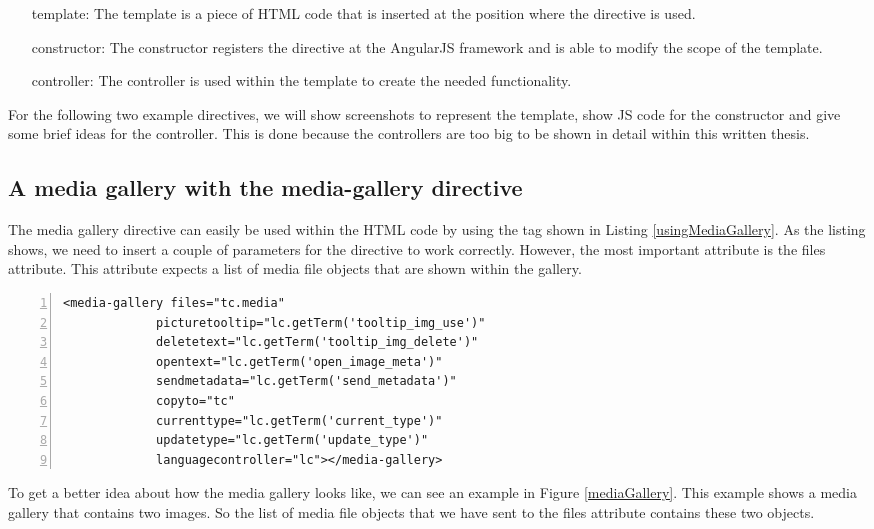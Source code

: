 \begin{itemize}
	\item[template:] The template is a piece of \ac{HTML} code that is inserted at the position where the directive is used. 
	\item[constructor:] The constructor registers the directive at the AngularJS framework and is able to modify the scope of the template.
	\item[controller:] The controller is used within the template to create the needed functionality.
\end{itemize}

For the following two example directives, we will show screenshots to represent the template, show \ac{JS} code for the constructor and give some brief ideas for the controller. This is done because the controllers are too big to be shown in detail within this written thesis.

\subsection{A media gallery with the media-gallery directive}
The media gallery directive can easily be used within the \ac{HTML} code by using the tag shown in Listing \ref{usingMediaGallery}. As the listing shows, we need to insert a couple of parameters for the directive to work correctly. However, the most important attribute is the files attribute. This attribute expects a list of media file objects that are shown within the gallery.

\begin{lstlisting}[numbers=left,caption={The listing shows the usage of the media gallery directive.},label=usingMediaGallery,frame=tlbr,breaklines]
<media-gallery files="tc.media"
             picturetooltip="lc.getTerm('tooltip_img_use')"
             deletetext="lc.getTerm('tooltip_img_delete')"
             opentext="lc.getTerm('open_image_meta')"
             sendmetadata="lc.getTerm('send_metadata')"
             copyto="tc"
             currenttype="lc.getTerm('current_type')"
             updatetype="lc.getTerm('update_type')"
             languagecontroller="lc"></media-gallery>
\end{lstlisting}

To get a better idea about how the media gallery looks like, we can see an example in Figure \ref{mediaGallery}. This example shows a media gallery that contains two images. So the list of media file objects that we have sent to the files attribute contains these two objects. 

